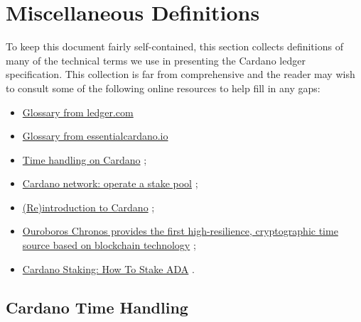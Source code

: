 \section{Miscellaneous Definitions}
\label{sec:misc-defs}
To keep this document fairly self-contained, this section collects definitions of
many of the technical terms we use in presenting the Cardano ledger specification.
This collection is far from comprehensive and the reader may wish to consult some of
the following online resources to help fill in any gaps:

\begin{itemize}
  \item
        \href{https://www.ledger.com/academy/glossary}%
             {Glossary from ledger.com} \textcite{www-ledger-academy-glossary}

  \item 
        \href{https://www.essentialcardano.io/glossary?sort=alphabetical}%
             {Glossary from essentialcardano.io} \textcite{www-essential-cardano-glossary}
  \item
        \href{https://docs.cardano.org/about-cardano/explore-more/time}%
             {Time handling on Cardano} \textcite{www-docs-cardano-time};
  \item
        \href{https://developers.cardano.org/docs/operate-a-stake-pool/introduction-to-cardano/}%
             {Cardano network: operate a stake pool} \textcite{www-docs-cardano-network};
  \item
        \href{https://developers.cardano.org/docs/operate-a-stake-pool/introduction-to-cardano/}%
             {(Re)introduction to Cardano} \textcite{www-developers-cardano-reintro};
  \item
        \href{https://iohk.io/en/blog/posts/2021/10/27/ouroboros-chronos-provides-the-first-high-resilience-cryptographic-time-source-based-on-blockchain/}%
             {Ouroboros Chronos provides the first high-resilience, cryptographic time source based on blockchain technology} \textcite{www-iohk-blog-ouroboros};
  \item
        \href{https://www.ledger.com/academy/cardano-staking-how-to-stake-ada}%
             {Cardano Staking: How To Stake ADA} \textcite{www-ledger-academy-stake-ada}.
\end{itemize}

\subsection{Cardano Time Handling}
\label{sec:cardano-time-handling}

